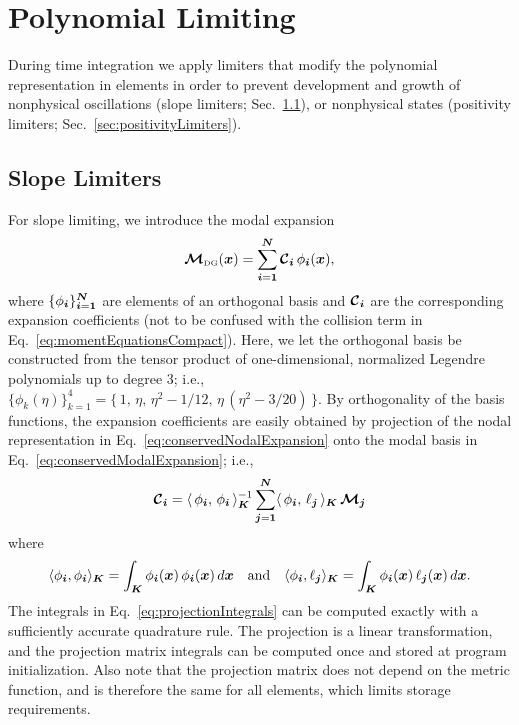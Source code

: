 \documentclass[10pt,preprint]{aastex}
\begin{document}
\section{Polynomial Limiting}

During time integration we apply limiters that modify the polynomial representation in elements in order to prevent development and growth of nonphysical oscillations (slope limiters; Sec.~\ref{sec:slopeLimiters}), or nonphysical states (positivity limiters; Sec.~\ref{sec:positivityLimiters}).  

\subsection{Slope Limiters}
\label{sec:slopeLimiters}

For slope limiting, we introduce the modal expansion
\begin{equation}
  \boldsymbol{\mathcal{M}}_{\mbox{\tiny DG}}(\boldsymbol{x})=\sum_{\boldsymbol{i}=\boldsymbol{1}}^{\boldsymbol{N}}\boldsymbol{\mathcal{C}}_{\boldsymbol{i}}\,\phi_{\boldsymbol{i}}(\boldsymbol{x}),
  \label{eq:conservedModalExpansion}
\end{equation}
where $\{\phi_{\boldsymbol{i}}\}_{\boldsymbol{i}=\boldsymbol{1}}^{\boldsymbol{N}}$ are elements of an orthogonal basis and $\boldsymbol{\mathcal{C}}_{\boldsymbol{i}}$ are the corresponding expansion coefficients (not to be confused with the collision term in Eq.~\eqref{eq:momentEquationsCompact}).  
Here, we let the orthogonal basis be constructed from the tensor product of one-dimensional, normalized Legendre polynomials up to degree 3; i.e., $\{\phi_{k}(\eta)\}_{k=1}^{4}=\{\,1,\,\eta,\,\eta^{2}-1/12,\,\eta\,(\eta^{2}-3/20)\,\}$.  
By orthogonality of the basis functions, the expansion coefficients are easily obtained by projection of the nodal representation in Eq.~\eqref{eq:conservedNodalExpansion} onto the modal basis in Eq.~\eqref{eq:conservedModalExpansion}; i.e.,
\begin{equation}
  \boldsymbol{\mathcal{C}}_{\boldsymbol{i}}
  =\langle\,\phi_{\boldsymbol{i}},\,\phi_{\boldsymbol{i}}\,\rangle_{\boldsymbol{K}}^{-1}\sum_{\boldsymbol{j}=\boldsymbol{1}}^{\boldsymbol{N}}\langle\,\phi_{\boldsymbol{i}},\,\ell_{\boldsymbol{j}}\,\rangle_{\boldsymbol{K}}\,\boldsymbol{\mathcal{M}}_{\boldsymbol{j}}
\end{equation}
where
\begin{equation}
  \langle\phi_{\boldsymbol{i}},\phi_{\boldsymbol{i}}\rangle_{\boldsymbol{K}}=\int_{\boldsymbol{K}}\phi_{\boldsymbol{i}}(\boldsymbol{x})\,\phi_{\boldsymbol{i}}(\boldsymbol{x})\,d\boldsymbol{x}
  \quad\text{and}\quad
  \langle\phi_{\boldsymbol{i}},\ell_{\boldsymbol{j}}\rangle_{\boldsymbol{K}}=\int_{\boldsymbol{K}}\phi_{\boldsymbol{i}}(\boldsymbol{x})\,\ell_{\boldsymbol{j}}(\boldsymbol{x})\,d\boldsymbol{x}.
  \label{eq:projectionIntegrals}
\end{equation}
The integrals in Eq.~\eqref{eq:projectionIntegrals} can be computed exactly with a sufficiently accurate quadrature rule.  
The projection is a linear transformation, and the projection matrix integrals can be computed once and stored at program initialization.  
Also note that the projection matrix does not depend on the metric function, and is therefore the same for all elements, which limits storage requirements.  
\end{document}
